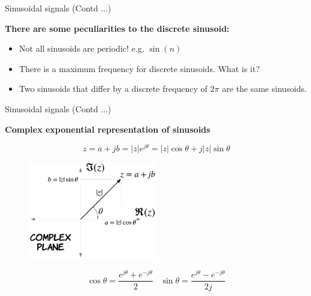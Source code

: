 \documentclass{beamer}
\begin{document}
\begin{frame}{Sinusoidal signals (Contd ...)}

\textbf{There are some peculiarities to the discrete sinusoid:}
\begin{itemize}
\item Not all sinusoids are periodic! e.g. $\sin(n)$
\item There is a maximum frequency for discrete sinusoids. What is it?
\item Two sinusoids that differ by a discrete frequency of $2\pi$ are the same sinusoids.
\end{itemize}

\end{frame}

\begin{frame}{Sinusoidal signals (Contd ...)}\

\textbf{Complex exponential representation of sinusoids}

\[ z = a + jb = \left|z\right|e^{j\theta} = \left|z\right|\cos \theta + j \left|z\right|\sin \theta\]

\begin{figure}
\includegraphics[width=0.5\textwidth]{img/complex_plane.png}
\end{figure}

\[ \cos \theta = \frac{e^{j\theta} + e^{-j\theta}}{2} \,\,\,\,\, \sin \theta = \frac{e^{j\theta} - e^{-j\theta}}{2j}\]

\end{frame}
\end{document}
